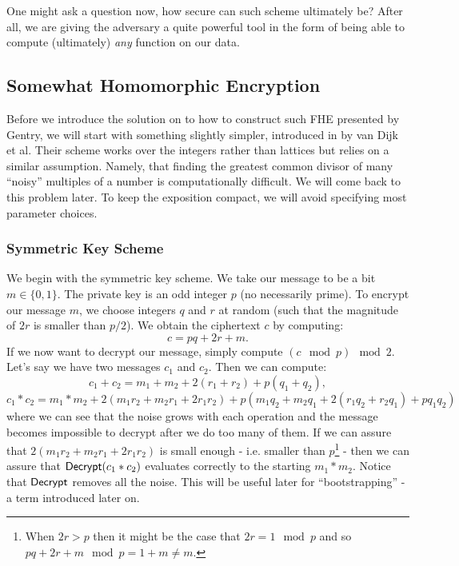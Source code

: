 One might ask a question now, how secure can such scheme ultimately be? After all, we are giving the adversary a quite powerful tool in the form of being able to compute (ultimately) \textit{any} function on our data.

\subsection{Somewhat Homomorphic Encryption}\label{int_she}
Before we introduce the solution on to how to construct such FHE presented by Gentry, we will start with something slightly simpler, introduced in \cite{int_scheme} by van Dijk et al. Their scheme works over the integers rather than lattices but relies on a similar assumption. Namely, that finding the greatest common divisor of many ``noisy'' multiples of a number is computationally difficult. We will come back to this problem later. To keep the exposition compact, we will avoid specifying most parameter choices.

\subsubsection*{Symmetric Key Scheme}
We begin with the symmetric key scheme. We take our message to be a bit $m \in \{0,1\}$. The private key is an odd integer $p$ (no necessarily prime). To encrypt our message $m$, we choose integers $q$ and $r$ at random (such that the magnitude of $2r$ is smaller than $p/2$). We obtain the ciphertext $c$ by computing: 
\begin{equation}c = pq + 2r + m.\end{equation}
If we now want to decrypt our message, simply compute $(c \mod p) \mod 2$. \\
Let's say we have two messages $c_1$ and $c_2$. Then we can compute:
$$ c_1 + c_2 = m_1 + m_2 + 2(r_1 + r_2) + p(q_1 + q_2),$$
$$ c_1 * c_2 = m_1 * m_2 + 2(m_1r_2 + m_2r_1 + 2r_1r_2) + p(m_1q_2 + m_2q_1 + 2(r_1q_2 + r_2q_1) + pq_1q_2)$$
where we can see that the noise grows with each operation and the message becomes impossible to decrypt after we do too many of them. If we can assure that $2(m_1r_2 + m_2r_1 + 2r_1r_2)$ is small enough - i.e. smaller than $p$\footnote{When $2r > p$ then it might be the case that $2r = 1 \mod p$ and so $pq + 2r + m \mod p = 1 + m \neq m$.} - then we can assure that $\textsf{Decrypt}(c_1 * c_2)$ evaluates correctly to the starting $m_1 * m_2$. Notice that $\textsf{Decrypt}$ removes all the noise. This will be useful later for ``bootstrapping'' - a term introduced later on.

